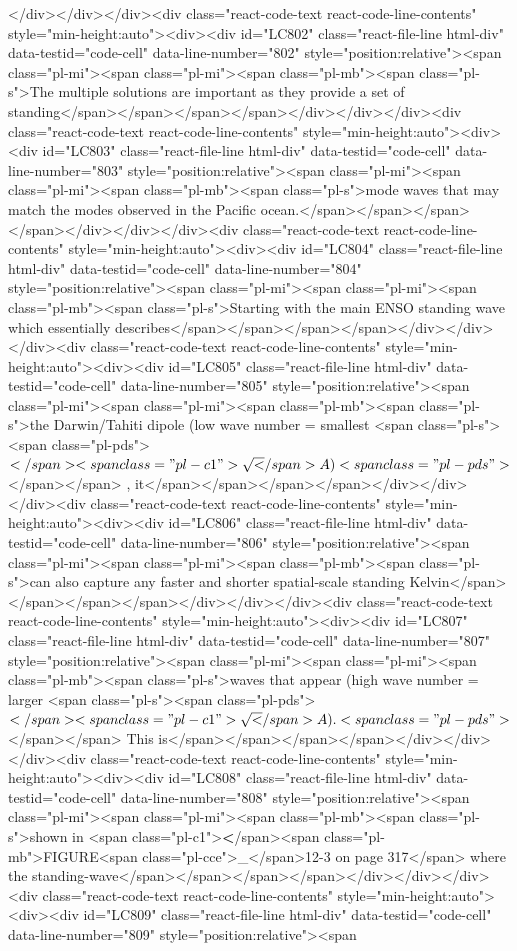 {{{{{{{{</div></div></div><div class="react-code-text react-code-line-contents" style="min-height:auto"><div><div id="LC802" class="react-file-line html-div" data-testid="code-cell" data-line-number="802" style="position:relative"><span class="pl-mi"><span class="pl-mi"><span class="pl-mb"><span class="pl-s">The multiple solutions are important as they provide a set of standing</span></span></span></span></div></div></div><div class="react-code-text react-code-line-contents" style="min-height:auto"><div><div id="LC803" class="react-file-line html-div" data-testid="code-cell" data-line-number="803" style="position:relative"><span class="pl-mi"><span class="pl-mi"><span class="pl-mb"><span class="pl-s">mode waves that may match the modes observed in the Pacific ocean.</span></span></span></span></div></div></div><div class="react-code-text react-code-line-contents" style="min-height:auto"><div><div id="LC804" class="react-file-line html-div" data-testid="code-cell" data-line-number="804" style="position:relative"><span class="pl-mi"><span class="pl-mi"><span class="pl-mb"><span class="pl-s">Starting with the main ENSO standing wave which essentially describes</span></span></span></span></div></div></div><div class="react-code-text react-code-line-contents" style="min-height:auto"><div><div id="LC805" class="react-file-line html-div" data-testid="code-cell" data-line-number="805" style="position:relative"><span class="pl-mi"><span class="pl-mi"><span class="pl-mb"><span class="pl-s">the Darwin/Tahiti dipole (low wave number = smallest <span class="pl-s"><span class="pl-pds">\(</span><span class="pl-c1">\sqrt</span>{A})<span class="pl-pds">\)</span></span> , it</span></span></span></span></div></div></div><div class="react-code-text react-code-line-contents" style="min-height:auto"><div><div id="LC806" class="react-file-line html-div" data-testid="code-cell" data-line-number="806" style="position:relative"><span class="pl-mi"><span class="pl-mi"><span class="pl-mb"><span class="pl-s">can also capture any faster and shorter spatial-scale standing Kelvin</span></span></span></span></div></div></div><div class="react-code-text react-code-line-contents" style="min-height:auto"><div><div id="LC807" class="react-file-line html-div" data-testid="code-cell" data-line-number="807" style="position:relative"><span class="pl-mi"><span class="pl-mi"><span class="pl-mb"><span class="pl-s">waves that appear (high wave number = larger <span class="pl-s"><span class="pl-pds">\(</span><span class="pl-c1">\sqrt</span>{A}).<span class="pl-pds">\)</span></span> This is</span></span></span></span></div></div></div><div class="react-code-text react-code-line-contents" style="min-height:auto"><div><div id="LC808" class="react-file-line html-div" data-testid="code-cell" data-line-number="808" style="position:relative"><span class="pl-mi"><span class="pl-mi"><span class="pl-mb"><span class="pl-s">shown in <span class="pl-c1">\textbf</span>{<span class="pl-mb">FIGURE<span class="pl-cce">\_</span>12-3 on page 317</span>} where the standing-wave</span></span></span></span></div></div></div><div class="react-code-text react-code-line-contents" style="min-height:auto"><div><div id="LC809" class="react-file-line html-div" data-testid="code-cell" data-line-number="809" style="position:relative"><span }}}}}}}}
